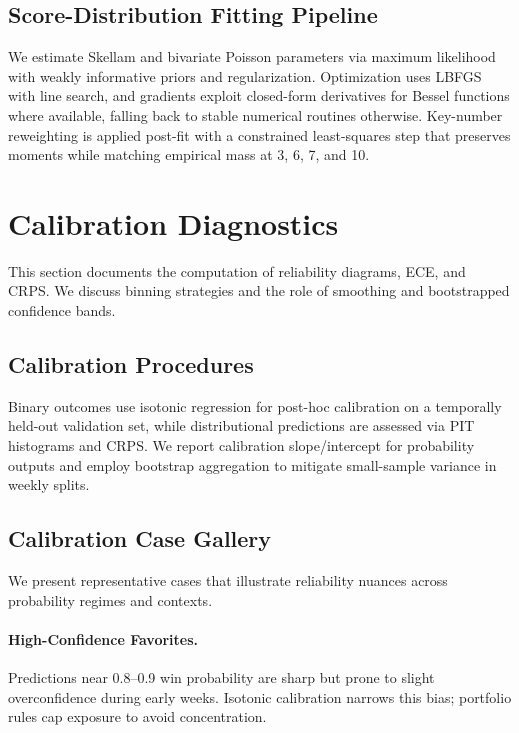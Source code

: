 \subsection{Score-Distribution Fitting Pipeline}
We estimate Skellam and bivariate Poisson parameters via maximum likelihood with weakly informative priors and regularization. Optimization uses LBFGS with line search, and gradients exploit closed-form derivatives for Bessel functions where available, falling back to stable numerical routines otherwise. Key-number reweighting is applied post-fit with a constrained least-squares step that preserves moments while matching empirical mass at 3, 6, 7, and 10.

\section{Calibration Diagnostics}\label{app:calibration}
This section documents the computation of reliability diagrams, ECE, and CRPS. We discuss binning strategies and the role of smoothing and bootstrapped confidence bands.

\subsection{Calibration Procedures}
Binary outcomes use isotonic regression for post-hoc calibration on a temporally held-out validation set, while distributional predictions are assessed via PIT histograms and CRPS. We report calibration slope/intercept for probability outputs and employ bootstrap aggregation to mitigate small-sample variance in weekly splits.

\subsection{Calibration Case Gallery}
We present representative cases that illustrate reliability nuances across probability regimes and contexts.

\paragraph{High-Confidence Favorites.}
Predictions near 0.8–0.9 win probability are sharp but prone to slight overconfidence during early weeks. Isotonic calibration narrows this bias; portfolio rules cap exposure to avoid concentration.


